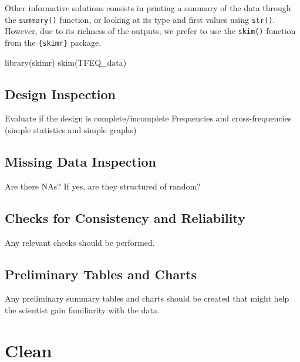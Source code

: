 \documentclass[
]{book}
\newenvironment{Shaded}{\begin{snugshade}}{\end{snugshade}}
\newcommand{\FunctionTok}[1]{\textcolor[rgb]{0.00,0.00,0.00}{#1}}
\newcommand{\NormalTok}[1]{#1}
\begin{document}
Other informative solutions consists in printing a summary of the data through the \texttt{summary()} function, or looking at its type and first values using \texttt{str()}. However, due to its richness of the outputs, we prefer to use the \texttt{skim()} function from the \texttt{\{skimr\}} package.

\begin{Shaded}
\begin{Highlighting}[]
\FunctionTok{library}\NormalTok{(skimr)}
\FunctionTok{skim}\NormalTok{(TFEQ\_data)}
\end{Highlighting}
\end{Shaded}

\hypertarget{design-inspection}{%
\subsection{Design Inspection}\label{design-inspection}}

Evaluate if the design is complete/incomplete
Frequencies and cross-frequencies (simple statistics and simple graphs)

\hypertarget{missing-data-inspection}{%
\subsection{Missing Data Inspection}\label{missing-data-inspection}}

Are there NAs?
If yes, are they structured of random?

\hypertarget{checks-for-consistency-and-reliability}{%
\subsection{Checks for Consistency and Reliability}\label{checks-for-consistency-and-reliability}}

Any relevant checks should be performed.

\hypertarget{preliminary-tables-and-charts}{%
\subsection{Preliminary Tables and Charts}\label{preliminary-tables-and-charts}}

Any preliminary summary tables and charts should be created that might help the scientist gain familiarity with the data.

\hypertarget{clean}{%
\section{Clean}\label{clean}}
\end{document}
